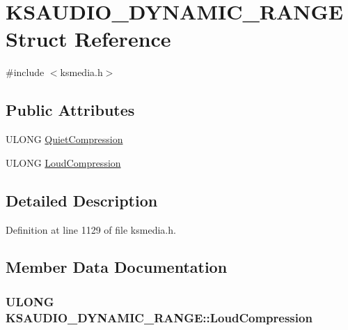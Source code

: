 \hypertarget{struct_k_s_a_u_d_i_o___d_y_n_a_m_i_c___r_a_n_g_e}{}\section{K\+S\+A\+U\+D\+I\+O\+\_\+\+D\+Y\+N\+A\+M\+I\+C\+\_\+\+R\+A\+N\+GE Struct Reference}
\label{struct_k_s_a_u_d_i_o___d_y_n_a_m_i_c___r_a_n_g_e}


{\ttfamily \#include $<$ksmedia.\+h$>$}

\subsection*{Public Attributes}
\begin{DoxyCompactItemize}
\item 
U\+L\+O\+NG \hyperlink{struct_k_s_a_u_d_i_o___d_y_n_a_m_i_c___r_a_n_g_e_a4f7620cb05453bf9f78226891fbe09a0}{Quiet\+Compression}
\item 
U\+L\+O\+NG \hyperlink{struct_k_s_a_u_d_i_o___d_y_n_a_m_i_c___r_a_n_g_e_af71eecf6681080315c08c766eecd34ed}{Loud\+Compression}
\end{DoxyCompactItemize}


\subsection{Detailed Description}


Definition at line 1129 of file ksmedia.\+h.



\subsection{Member Data Documentation}
\subsubsection[{\texorpdfstring{Loud\+Compression}{LoudCompression}}]{\setlength{\rightskip}{0pt plus 5cm}U\+L\+O\+NG K\+S\+A\+U\+D\+I\+O\+\_\+\+D\+Y\+N\+A\+M\+I\+C\+\_\+\+R\+A\+N\+G\+E\+::\+Loud\+Compression}\hypertarget{struct_k_s_a_u_d_i_o___d_y_n_a_m_i_c___r_a_n_g_e_af71eecf6681080315c08c766eecd34ed}{}\label{struct_k_s_a_u_d_i_o___d_y_n_a_m_i_c___r_a_n_g_e_af71eecf6681080315c08c766eecd34ed}


